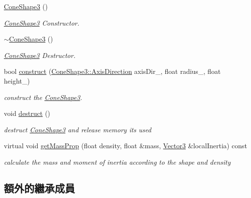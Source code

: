 \begin{DoxyCompactItemize}
\item 
\hyperlink{class_magnum_1_1_cone_shape3_a71e6ebdc2ae8340a862d6d80737f9247}{Cone\+Shape3} ()
\begin{DoxyCompactList}\small\item\em \hyperlink{class_magnum_1_1_cone_shape3}{Cone\+Shape3} Constructor. \end{DoxyCompactList}\item 
\hyperlink{class_magnum_1_1_cone_shape3_a791cb68a3c6398018ecda36db4beeeae}{$\sim$\+Cone\+Shape3} ()
\begin{DoxyCompactList}\small\item\em \hyperlink{class_magnum_1_1_cone_shape3}{Cone\+Shape3} Destructor. \end{DoxyCompactList}\item 
bool \hyperlink{class_magnum_1_1_cone_shape3_afcf9be9a378121092ea4636421f1a5f6}{construct} (\hyperlink{class_magnum_1_1_cone_shape3_a7c6d6ac946d54755b7e7a64217e07ea3}{Cone\+Shape3\+::\+Axis\+Direction} axis\+Dir\+\_\+, float radius\+\_\+, float height\+\_\+)
\begin{DoxyCompactList}\small\item\em construct the \hyperlink{class_magnum_1_1_cone_shape3}{Cone\+Shape3}. \end{DoxyCompactList}\item 
void \hyperlink{class_magnum_1_1_cone_shape3_a37b91e9e3716c959d37307d89c275fc3}{destruct} ()\hypertarget{class_magnum_1_1_cone_shape3_a37b91e9e3716c959d37307d89c275fc3}{}\label{class_magnum_1_1_cone_shape3_a37b91e9e3716c959d37307d89c275fc3}

\begin{DoxyCompactList}\small\item\em destruct \hyperlink{class_magnum_1_1_cone_shape3}{Cone\+Shape3} and release memory its used \end{DoxyCompactList}\item 
virtual void \hyperlink{class_magnum_1_1_cone_shape3_a8082855a635e33d5d9f209a953b0f15d}{get\+Mass\+Prop} (float density, float \&mass, \hyperlink{class_magnum_1_1_vector3}{Vector3} \&local\+Inertia) const 
\begin{DoxyCompactList}\small\item\em calculate the mass and moment of inertia according to the shape and density \end{DoxyCompactList}\end{DoxyCompactItemize}
\subsection*{額外的繼承成員}


